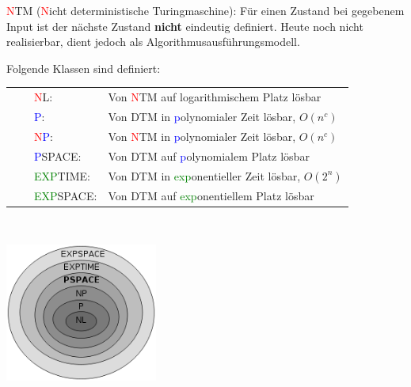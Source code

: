 \textcolor{red}{N}TM (\textcolor{red}{N}icht deterministische Turingmaschine): Für einen Zustand bei gegebenem Input ist der nächste Zustand \textbf{nicht} eindeutig definiert. Heute noch nicht realisierbar, dient jedoch als Algorithmusausführungsmodell.\\

\begin{minipage}{12cm}
Folgende Klassen sind definiert:\\
\newcommand{\tabitem}{~~\llap{\textbullet}~~}
\begin{tabular}{ll}
\tabitem \textcolor{red}{N}L:                       & Von \textcolor{red}{N}TM auf logarithmischem Platz lösbar \\
\tabitem \textcolor{blue}{P}:                       & Von DTM in \textcolor{blue}{p}olynomialer Zeit lösbar, $O(n^c)$\\
\tabitem \textcolor{red}{N}\textcolor{blue}{P}:     & Von \textcolor{red}{N}TM in \textcolor{blue}{p}olynomialer Zeit lösbar, $O(n^c)$\\
\tabitem \textcolor{blue}{P}SPACE:                  & Von DTM auf \textcolor{blue}{p}olynomialem Platz lösbar\\
\tabitem \textcolor{green}{EXP}TIME:                & Von DTM in \textcolor{green}{exp}onentieller Zeit lösbar, $O(2^n)$\\
\tabitem \textcolor{green}{EXP}SPACE:               & Von DTM auf \textcolor{green}{exp}onentiellem Platz lösbar
\end{tabular}
\end{minipage}~
\begin{minipage}{6cm}
\includegraphics[width=5cm]{images/Algorithmen/KomplexKlassen.png}
\end{minipage}\\

